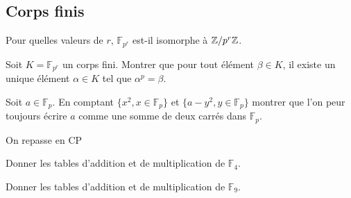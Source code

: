 \documentclass[french]{report}
\begin{document}
\subsection*{Corps finis}

\begin{exo}
    Pour quelles valeurs de \(r\), \(\mathbb{F}_{p^r}\) est-il isomorphe à \(\mathbb{Z}/p^r\mathbb{Z}\).
\end{exo}

\begin{exo}
    Soit \(K=\mathbb{F}_{p^r}\) un corps fini. Montrer que pour tout élément \(\beta\in K\),
    il existe un unique élément \(\alpha\in K\) tel que \(\alpha^p=\beta\).
\end{exo}

\begin{exo}
    Soit \(a\in\mathbb{F}_p\). En comptant \(\{x^2,x\in\mathbb{F}_p\}\) et
    \(\{a-y^2,y\in\mathbb{F}_p\}\) montrer que l'on peur toujours écrire \(a\) comme
    une somme de deux carrés dans \(\mathbb{F}_p\).
\end{exo}

\begin{exo}
    On repasse en CP
    \begin{q}{1}
        Donner les tables d'addition et de multiplication de \(\mathbb{F}_4\).
    \end{q}
    \begin{q}{2}
        Donner les tables d'addition et de multiplication de \(\mathbb{F}_9\).
    \end{q}
\end{exo}
\end{document}

